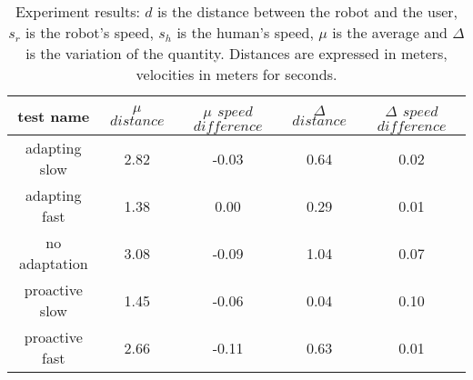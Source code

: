 


\begin{table}
 \vspace{-20pt}
\caption{Experiment results: $d$ is the distance between the robot and the user, $s_r$ is the robot's speed, $s_h$ is the human's speed, $\mu$ is the average and $\Delta$ is the variation of the quantity. Distances are expressed in meters, velocities in meters for seconds.}
\centering
\begin{tabular}{ | c | c | c | c | c | }

\hline
  test name     & $\mu$ $distance$ & $\mu$ $speed$ $difference$ & $\Delta$ $distance$ & $\Delta$ $speed$ $difference$ \\
\hline
adapting slow & 2.82 & -0.03 & 0.64 & 0.02 \\
  \hline
  adapting fast & 1.38 & 0.00 & 0.29 & 0.01 \\
  \hline
  no adaptation & 3.08 & -0.09 & 1.04 & 0.07 \\
\hline
proactive slow & 1.45 & -0.06 & 0.04 & 0.10 \\
\hline
proactive fast & 2.66 & -0.11 & 0.63 & 0.01 \\
\hline
\end{tabular}
\label{table:experiment results}
 \vspace{-20pt}
\end{table}


